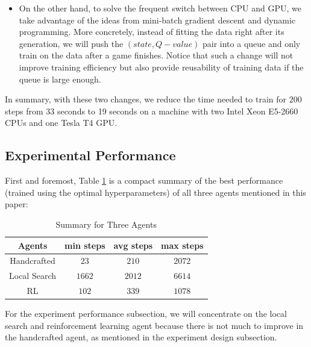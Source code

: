 \documentclass[letterpaper]{article} %
\begin{document}
\begin{itemize}
\begin{itemize}
  \item 
  On the other hand, to solve the frequent switch between CPU and GPU, we take advantage of the ideas from mini-batch gradient descent and dynamic programming. More concretely, instead of fitting the data right after its generation, we will push the $(state, Q-value)$ pair into a queue and only train on the data after a game finishes. Notice that such a change will not improve training efficiency but also provide reusability of training data if the queue is large enough.
\end{itemize}
In summary, with these two changes, we reduce the time needed to train for $200$ steps from 33 seconds to 19 seconds on a machine with two Intel Xeon E5-2660 CPUs and one Tesla T4 GPU.
\end{itemize}

\subsection{Experimental Performance}

First and foremost, Table \ref{tab:resultsSummary} is a compact summary of the best performance (trained using the optimal hyperparameters) of all three agents mentioned in this paper: 

\begin{table}[h!]
  \centering
  \normalsize{
    \begin{tabular}{ cccc } 
      \hline
      Agents & min steps & avg steps & max steps  \\ 
      \hline
      \hline
      Handcrafted & $23$ & $210$ & $2072$ \\ 
      Local Search & $1662$ & $2012$ & $6614$\\ 
      RL & $102$ & $339$ & $1078$\\
       \hline
      \end{tabular}}
  \caption{Summary for Three Agents}
  \label{tab:resultsSummary}
\end{table} 

For the experiment performance subsection, we will concentrate on the local search and reinforcement learning agent because there is not much to improve in the handcrafted agent, as mentioned in the experiment design subsection. 
\end{document}
